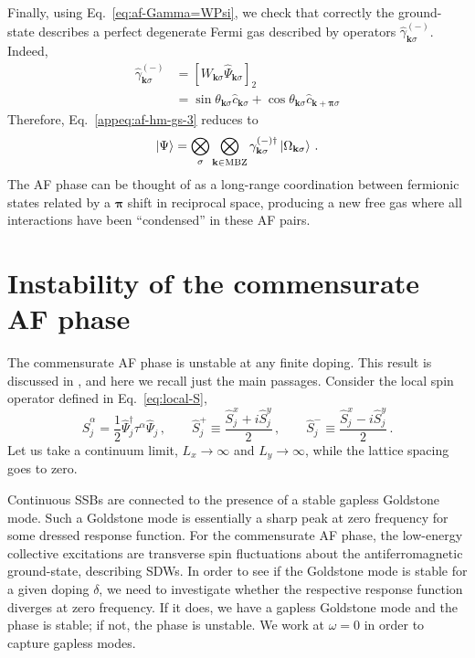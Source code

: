 Finally, using Eq.~\eqref{eq:af-Gamma=WPsi}, we check that correctly the ground-state describes a perfect degenerate Fermi gas described by operators $\hat \gamma^{(-)}_{\mathbf{k}\sigma}$. Indeed,
\[
\begin{aligned}
	\hat \gamma^{(-)}_{\mathbf{k}\sigma} &= \left[W_{\mathbf{k}\sigma} \hat \Psi_{\mathbf{k}\sigma}\right]_2 \\
	&= \sin \theta_{\mathbf{k}\sigma} \hat c_{\mathbf{k}\sigma} + \cos \theta_{\mathbf{k}\sigma} \hat c_{\mathbf{k}+\bm{\pi}\sigma}
\end{aligned}
\]
Therefore, Eq.~\eqref{appeq:af-hm-gs-3} reduces to
\begin{equation}\label{appeq:af-hm-gs-4}
	\ket{\Psi} = \bigotimes_\sigma \bigotimes_{\mathbf{k}\in\mathrm{MBZ}} \gamma_{\mathbf{k}\sigma}^{(-)\dagger} \ket{\Omega_{\mathbf{k}\sigma}} \, .
\end{equation}
The AF phase can be thought of as a long-range coordination between fermionic states related by a $\bm{\pi}$ shift in reciprocal space, producing a new free gas where all interactions have been ``condensed'' in these AF pairs.

\section{Instability of the commensurate AF phase}\label{appsubsec:af-instability}

The commensurate AF phase is unstable at any finite doping. This result is discussed in \cite{singh1990collective,singh1991doped}, and here we recall just the main passages. Consider the local spin operator defined in Eq.~\eqref{eq:local-S},
\[
	\hat S_j^\alpha = \frac{1}{2} \hat \Psi_j^\dagger \tau^\alpha \hat \Psi_j \, ,
	\qquad
	\hat S_j^+ \equiv \frac{\hat S_j^x + i\hat S_j^y}{2} \, ,
	\qquad
	\hat S_j^- \equiv \frac{\hat S_j^x - i\hat S_j^y}{2} \, .
\]
Let us take a continuum limit, $L_x \to \infty$ and $L_y \to \infty$, while the lattice spacing goes to zero.

Continuous SSBs are connected to the presence of a stable gapless Goldstone mode. Such a Goldstone mode is essentially a sharp peak at zero frequency for some dressed response function. For the commensurate AF phase, the low-energy collective excitations are transverse spin fluctuations about the antiferromagnetic ground-state, describing SDWs. In order to see if the Goldstone mode is stable for a given doping $\delta$, we need to investigate whether the respective response function diverges at zero frequency. If it does, we have a gapless Goldstone mode and the phase is stable; if not, the phase is unstable. We work at $\omega=0$ in order to capture gapless modes.

